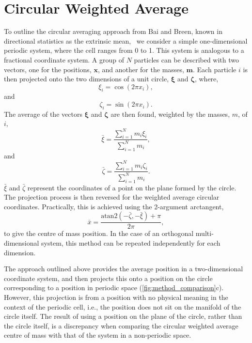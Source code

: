 \documentclass[reprint,superscriptaddress,nobibnotes,amsmath,amssymb,aip]{revtex4-2}
\begin{document}
\section{Circular Weighted Average}

To outline the circular averaging approach from Bai and Breen, known in directional statistics as the extrinsic mean,~\cite{hotz_intrinsic_2014} we consider a simple one-dimensional periodic system, where the cell ranges from \num{0} to \num{1}. 
This system is analogous to a fractional coordinate system. 
A group of $N$ particles can be described with two vectors, one for the positions, $\bm{x}$, and another for the masses, $\bm{m}$. 
Each particle $i$ is then projected onto the two dimensions of a unit circle, $\bm{\xi}$ and $\bm{\zeta}$, where, 
%
\begin{equation}
    \xi_i = \cos(2\pi x_i),
\end{equation}
%
and 
%
\begin{equation}
    \zeta_i = \sin(2\pi x_i).
\end{equation}
The average of the vectors $\bm{\xi}$ and $\bm{\zeta}$ are then found, weighted by the masses, $m$, of $i$,
%
\begin{equation}
    \bar{\xi} = \frac{\sum_{i=1}^{N}m_i\xi_i}{\sum_{i=1}^{N}m_i},
\end{equation}
% 
and
%
\begin{equation}
    \bar{\zeta} = \frac{\sum_{i=1}^{N}m_i\zeta_i}{\sum_{i=1}^{N}m_i}.
\end{equation}
% 
$\bar{\xi}$ and $\bar{\zeta}$ represent the coordinates of a point on the plane formed by the circle. 
The projection process is then reversed for the weighted average circular coordinates.
Practically, this is achieved using the 2-argument arctangent, 
%
\begin{equation}
    \bar{x} = \frac{\text{atan}2(-\bar{\zeta}, -\bar{\xi}) + \pi}{2\pi},
\end{equation}
%
to give the centre of mass position.
In the case of an orthogonal multi-dimensional system, this method can be repeated independently for each dimension. 

The approach outlined above provides the average position in a two-dimensional coordinate system, and then projects this onto a position on the circle corresponding to a position in periodic space (\cref{fig:method_comparison}c). 
However, this projection is from a position with no physical meaning in the context of the periodic cell, i.e., the position does not sit on the manifold of the circle itself.
The result of using a position on the plane of the circle, rather than the circle itself, is a discrepancy when comparing the circular weighted average centre of mass with that of the system in a non-periodic space. 
\end{document}
